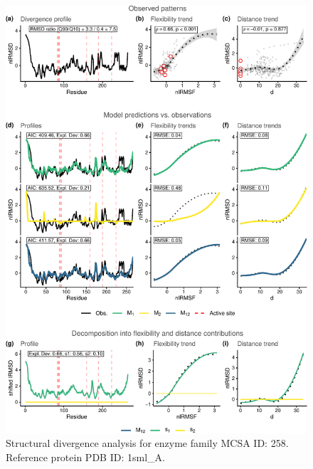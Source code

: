 \documentclass[
]{article}
\begin{document}
\clearpage
\begin{figure}[H]
\centering


\begin{center}\includegraphics{supplementary_material_files/figure-latex/generate_figures-14} \end{center}

\caption{Structural divergence analysis for enzyme family MCSA ID: 258. Reference protein PDB ID: 1sml\_A.}
\end{figure}
\end{document}
